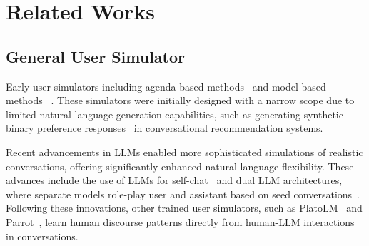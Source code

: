 \section{Related Works}
\subsection{General User Simulator}

Early user simulators including agenda-based methods~\cite{schatzmann2007agenda,schatzmann2009hidden} and model-based methods ~\cite{asri2016sequence,kreyssig2018neural}. These simulators were initially designed with a narrow scope due to limited natural language generation capabilities, such as generating synthetic binary preference responses~\cite{christakopoulou2016towards} in conversational recommendation systems.  

Recent advancements in LLMs enabled more sophisticated simulations of realistic conversations, offering significantly enhanced natural language flexibility. These advances include the use of LLMs for self-chat~\cite{XuGDM23} and dual LLM architectures, where separate models role-play user and assistant based on seed conversations~\cite{DingCXQHL0Z23}. Following these innovations, other trained user simulators, such as PlatoLM~\cite{KongFWJW24} and Parrot~\cite{SunLZHSZZZG24}, learn human discourse patterns directly from human-LLM interactions in conversations.






